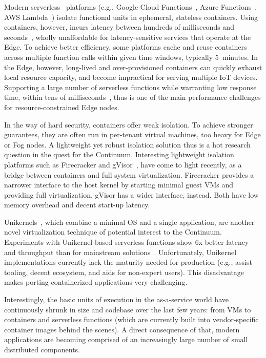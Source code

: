 Modern serverless~\cite{jonas2019cloud} platforms (e.g., Google Cloud Functions~\cite{gcloud-functions}, Azure Functions~\cite{azure-functions}, AWS Lambda~\cite{aws-lambda}) isolate functional units in ephemeral, stateless containers. 
Using containers, however, incurs latency between hundreds of milliseconds and seconds~\cite{mohanty2018evaluation}, wholly unaffordable for latency-sensitive services that operate at the Edge. 
To achieve better efficiency, some platforms cache and reuse containers across multiple function calls within given time windows, typically 5~minutes. 
In the Edge, however, long-lived and over-provisioned containers can quickly exhaust local resource capacity, and become impractical for serving multiple IoT devices. 
Supporting a large number of serverless functions while warranting low response time, within tens of milliseconds~\cite{elbamby2019wireless}, thus is one of the main performance challenges for resource-constrained Edge nodes.

In the way of hard security, containers offer weak isolation. To achieve stronger guarantees, they are often run in per-tenant virtual machines, too heavy for Edge or Fog nodes. 
A light\-weight yet robust isolation solution thus is a hot research question in the quest for the Continuum.
Interesting lightweight isolation platforms such as Firecracker and gVisor~\cite{caraza2020blending}, have come to light recently, as a bridge between containers and full system virtualization. 
Firecracker provides a narrower interface to the host kernel by starting minimal guest VMs and providing full virtualization. gVisor has a wider interface, instead. 
Both have low memory overhead and decent start-up latency.

Unikernels~\cite{madhavapeddy2013unikernels}, which combine a minimal OS and a single application, are another novel virtualization technique of potential interest to the Continuum. Experiments with Unikernel-based serverless functions show 6x better latency and throughput than for mainstream solutions~\cite{koller2017will}. 
Unfortunately, Unikernel implementations currently lack the maturity needed for production (e.g., assist tooling, decent ecosystem, and aids for non-expert users). This disadvantage makes porting containerized applications very challenging. 

Interestingly, the basic units of execution in the as-a-service world have continuously shrunk in size and codebase over the last few years: from VMs to containers and serverless functions (which are currently built into vendor-specific container images behind the scenes).
A direct consequence of that, modern applications are becoming comprised of an increasingly large number of small distributed components.

